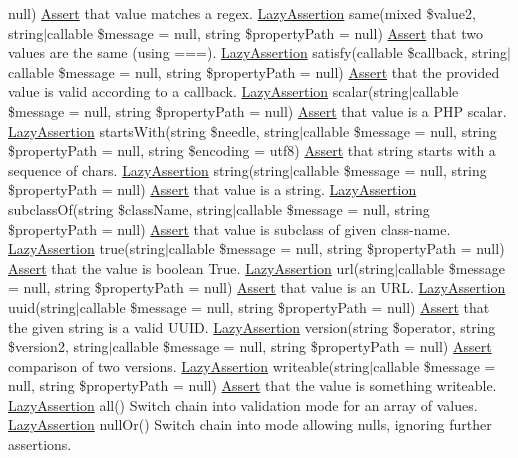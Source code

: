 null) \mbox{\hyperlink{class_assert_1_1_assert}{Assert}} that value matches a regex.  \mbox{\hyperlink{class_assert_1_1_lazy_assertion}{Lazy\+Assertion}} same(mixed \$value2, string$\vert$callable \$message = null, string \$property\+Path = null) \mbox{\hyperlink{class_assert_1_1_assert}{Assert}} that two values are the same (using ===).  \mbox{\hyperlink{class_assert_1_1_lazy_assertion}{Lazy\+Assertion}} satisfy(callable \$callback, string$\vert$callable \$message = null, string \$property\+Path = null) \mbox{\hyperlink{class_assert_1_1_assert}{Assert}} that the provided value is valid according to a callback.  \mbox{\hyperlink{class_assert_1_1_lazy_assertion}{Lazy\+Assertion}} scalar(string$\vert$callable \$message = null, string \$property\+Path = null) \mbox{\hyperlink{class_assert_1_1_assert}{Assert}} that value is a P\+HP scalar.  \mbox{\hyperlink{class_assert_1_1_lazy_assertion}{Lazy\+Assertion}} starts\+With(string \$needle, string$\vert$callable \$message = null, string \$property\+Path = null, string \$encoding = \textquotesingle{}utf8\textquotesingle{}) \mbox{\hyperlink{class_assert_1_1_assert}{Assert}} that string starts with a sequence of chars.  \mbox{\hyperlink{class_assert_1_1_lazy_assertion}{Lazy\+Assertion}} string(string$\vert$callable \$message = null, string \$property\+Path = null) \mbox{\hyperlink{class_assert_1_1_assert}{Assert}} that value is a string.  \mbox{\hyperlink{class_assert_1_1_lazy_assertion}{Lazy\+Assertion}} subclass\+Of(string \$class\+Name, string$\vert$callable \$message = null, string \$property\+Path = null) \mbox{\hyperlink{class_assert_1_1_assert}{Assert}} that value is subclass of given class-\/name.  \mbox{\hyperlink{class_assert_1_1_lazy_assertion}{Lazy\+Assertion}} true(string$\vert$callable \$message = null, string \$property\+Path = null) \mbox{\hyperlink{class_assert_1_1_assert}{Assert}} that the value is boolean True.  \mbox{\hyperlink{class_assert_1_1_lazy_assertion}{Lazy\+Assertion}} url(string$\vert$callable \$message = null, string \$property\+Path = null) \mbox{\hyperlink{class_assert_1_1_assert}{Assert}} that value is an U\+RL.  \mbox{\hyperlink{class_assert_1_1_lazy_assertion}{Lazy\+Assertion}} uuid(string$\vert$callable \$message = null, string \$property\+Path = null) \mbox{\hyperlink{class_assert_1_1_assert}{Assert}} that the given string is a valid U\+U\+ID.  \mbox{\hyperlink{class_assert_1_1_lazy_assertion}{Lazy\+Assertion}} version(string \$operator, string \$version2, string$\vert$callable \$message = null, string \$property\+Path = null) \mbox{\hyperlink{class_assert_1_1_assert}{Assert}} comparison of two versions.  \mbox{\hyperlink{class_assert_1_1_lazy_assertion}{Lazy\+Assertion}} writeable(string$\vert$callable \$message = null, string \$property\+Path = null) \mbox{\hyperlink{class_assert_1_1_assert}{Assert}} that the value is something writeable.  \mbox{\hyperlink{class_assert_1_1_lazy_assertion}{Lazy\+Assertion}} all() Switch chain into validation mode for an array of values.  \mbox{\hyperlink{class_assert_1_1_lazy_assertion}{Lazy\+Assertion}} null\+Or() Switch chain into mode allowing nulls, ignoring further assertions. 


